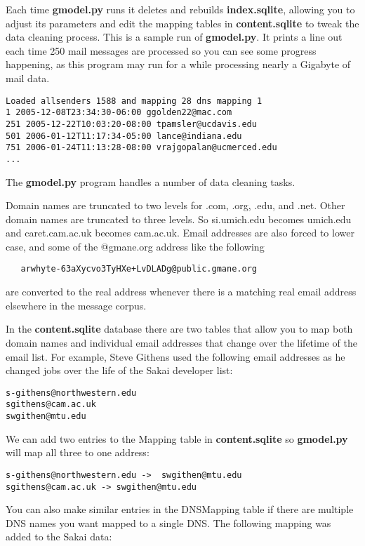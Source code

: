 Each time {\bf gmodel.py} runs it deletes and rebuilds {\bf index.sqlite}, allowing
you to adjust its parameters and edit the mapping tables in {\bf content.sqlite} to tweak the 
data cleaning process. This is a sample run of {\bf gmodel.py}.  It prints a line out each time
250 mail messages are processed so you can see some progress happening, as this program may
run for a while processing nearly a Gigabyte of mail data.

\beforeverb
\begin{verbatim}
Loaded allsenders 1588 and mapping 28 dns mapping 1
1 2005-12-08T23:34:30-06:00 ggolden22@mac.com
251 2005-12-22T10:03:20-08:00 tpamsler@ucdavis.edu
501 2006-01-12T11:17:34-05:00 lance@indiana.edu
751 2006-01-24T11:13:28-08:00 vrajgopalan@ucmerced.edu
...
\end{verbatim}
\afterverb
%

The {\bf gmodel.py} program handles a number of data cleaning tasks.

Domain names are truncated to two levels for .com, .org, .edu, and .net.
Other domain names are truncated to three levels.  So si.umich.edu becomes
umich.edu and caret.cam.ac.uk becomes cam.ac.uk.   Email addresses are also
forced to lower case, and some of the @gmane.org address like the following

\beforeverb
\begin{verbatim}
   arwhyte-63aXycvo3TyHXe+LvDLADg@public.gmane.org
\end{verbatim}
\afterverb
%
are converted to the real address whenever there is a matching real email
address elsewhere in the message corpus.

In the {\bf content.sqlite} database there are two tables that allow
you to map both domain names and individual email addresses that change over 
the lifetime of the email list.  For example, Steve Githens used the following
email addresses as he changed jobs over the life of the Sakai developer list:

\beforeverb
\begin{verbatim}
s-githens@northwestern.edu
sgithens@cam.ac.uk
swgithen@mtu.edu
\end{verbatim}
\afterverb
%
We can add two entries to the Mapping table in {\bf content.sqlite} so 
{\bf gmodel.py} will map all three to one address:

\beforeverb
\begin{verbatim}
s-githens@northwestern.edu ->  swgithen@mtu.edu
sgithens@cam.ac.uk -> swgithen@mtu.edu
\end{verbatim}
\afterverb
%
You can also make similar entries in the DNSMapping table if there are multiple
DNS names you want mapped to a single DNS.  The following mapping was added to the Sakai data:


